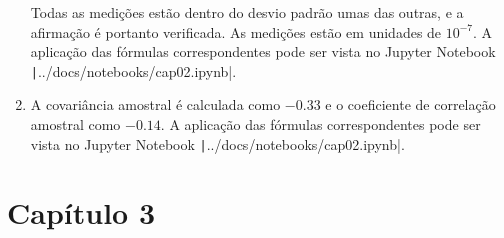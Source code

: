 \begin{enumerate}[label=\textbf{2.\arabic*.}]
	Todas as medições estão dentro do desvio padrão umas das outras, e a afirmação é portanto verificada. As medições estão em unidades de $10^{-7}$. A aplicação das fórmulas correspondentes pode ser vista no Jupyter Notebook \texttt|../docs/notebooks/cap02.ipynb|.
	
	\item A covariância amostral é calculada como $-0.33$ e o coeficiente de correlação amostral como $-0.14$. A aplicação das fórmulas correspondentes pode ser vista no Jupyter Notebook \texttt|../docs/notebooks/cap02.ipynb|. 
\end{enumerate}

\section*{Capítulo 3}

